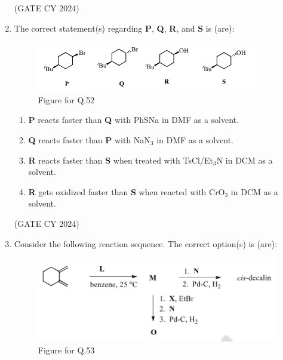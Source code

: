 \documentclass[12pt]{article}
\begin{document}
\begin{enumerate}
\hfill (GATE CY 2024)

\item The correct statement(s) regarding \textbf{P}, \textbf{Q}, \textbf{R}, and \textbf{S} is (are):

\begin{figure}[H]
\centering
\includegraphics[width=0.65\columnwidth]{figs/q52.png}
\caption{Figure for Q.52}
\label{fig:q52}
\end{figure}

\begin{enumerate}
\item \textbf{P} reacts faster than \textbf{Q} with PhSNa in DMF as a solvent.

\item \textbf{Q} reacts faster than \textbf{P} with NaN$_3$ in DMF as a solvent.

\item \textbf{R} reacts faster than \textbf{S} when treated with TsCl/Et$_3$N in DCM as a solvent.

\item \textbf{R} gets oxidized faster than \textbf{S} when reacted with CrO$_3$ in DCM as a solvent.
\end{enumerate}
\hfill (GATE CY 2024)

\item Consider the following reaction sequence. The correct option(s) is (are):

\begin{figure}[H]
\centering
\includegraphics[width=0.55\columnwidth]{figs/q53.png}
\caption{Figure for Q.53}
\label{fig:q53}
\end{figure}


\end{enumerate}
\end{document}
